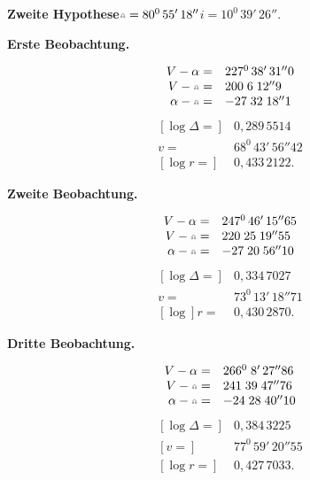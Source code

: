 \clearpage
\begingroup
{}
\noindent{\small [S. 4]}\par
\noindent\hspace*{\parindent}\textbf{Zweite Hypothese}\quad $\AstNode=80^0\,55'\,18''$\qquad $i=10^0\,39'\,26''$.
\begin{center}\textbf{Erste Beobachtung.}\end{center}
\[
\begin{array}{rl}
V-\alpha=&227^0\,38'\,31''0\\
V-\AstNode=&200\;6\;12''9\\
\alpha-\AstNode=&-27\;32\;18''1
\end{array}
\]
\[
\begin{array}{rl}
{}[\log\Delta=]&0{,}289\,5514\\
v=&68^0\,43'\,56''42\\
{}[\log r=]&0{,}433\,2122.
\end{array}
\]
\begin{center}\textbf{Zweite Beobachtung.}\end{center}
\[
\begin{array}{rl}
V-\alpha=&247^0\,46'\,15''65\\
V-\AstNode=&220\;25\;19''55\\
\alpha-\AstNode=&-27\;20\;56''10
\end{array}
\]
\[
\begin{array}{rl}
{}[\log\Delta=]&0{,}334\,7027\\
v=&73^0\,13'\,18''71\\
{}[\log]r=&0{,}430\,2870.
\end{array}
\]
\begin{center}\textbf{Dritte Beobachtung.}\end{center}
\[
\begin{array}{rl}
V-\alpha=&266^0\;8'\,27''86\\
V-\AstNode=&241\;39\;47''76\\
\alpha-\AstNode=&-24\;28\;40''10
\end{array}
\]
\[
\begin{array}{rl}
{}[\log\Delta=]&0{,}384\,3225\\
{}[v=]&77^0\,59'\,20''55\\
{}[\log r=]&0{,}427\,7033.
\end{array}
\]
\begin{center}\end{center}
